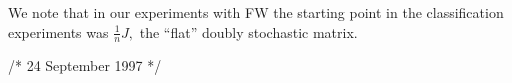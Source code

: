 We note that in our experiments with FW the starting point in the classification
experiments was $\frac{1}{n} J,$ the ``flat'' doubly stochastic matrix.
%
%
%
%
%








/* 24 September 1997 */
\Refs %
\widestnumber{}
\widestnumber{}
